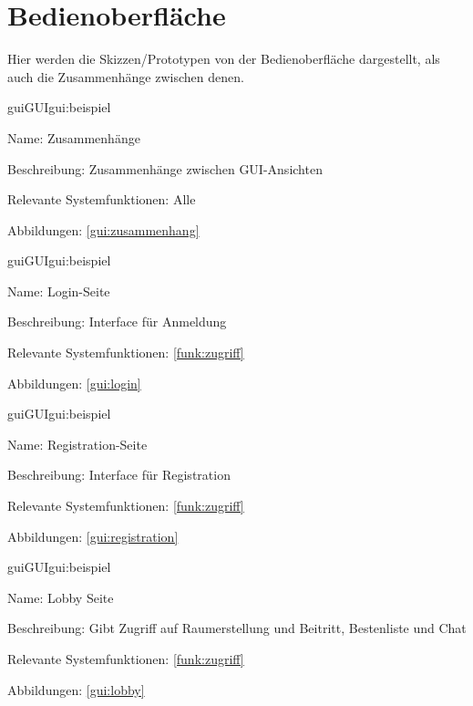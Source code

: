 
\section{Bedienoberfläche}

Hier werden die Skizzen/Prototypen von der Bedienoberfläche dargestellt, als auch die Zusammenhänge zwischen denen.

\setcounter{gui}{10}

\begin{description}[leftmargin=5em, style=sameline]	
	\begin{lhp}{gui}{GUI}{gui:beispiel}
		\item[Name:] Zusammenhänge
		\item[Beschreibung:] Zusammenhänge zwischen GUI-Ansichten
		\item[Relevante Systemfunktionen:] Alle
		\item[Abbildungen:] \ref{gui:zusammenhang}
	\end{lhp}
\end{description}

\begin{description}[leftmargin=5em, style=sameline]	
	\begin{lhp}{gui}{GUI}{gui:beispiel}
		\item[Name:] Login-Seite
		\item[Beschreibung:] Interface für Anmeldung
		\item[Relevante Systemfunktionen:] \ref{funk:zugriff}
		\item[Abbildungen:] \ref{gui:login}
	\end{lhp}
\end{description}

\begin{description}[leftmargin=5em, style=sameline]	
	\begin{lhp}{gui}{GUI}{gui:beispiel}
		\item[Name:] Registration-Seite
		\item[Beschreibung:] Interface für Registration
		\item[Relevante Systemfunktionen:] \ref{funk:zugriff}
		\item[Abbildungen:] \ref{gui:registration}
	\end{lhp}
\end{description}

\begin{description}[leftmargin=5em, style=sameline]	
	\begin{lhp}{gui}{GUI}{gui:beispiel}
		\item[Name:] Lobby Seite
		\item[Beschreibung:] Gibt Zugriff auf Raumerstellung und Beitritt, Bestenliste und Chat 
		\item[Relevante Systemfunktionen:] \ref{funk:zugriff}
		\item[Abbildungen:] \ref{gui:lobby}
	\end{lhp}
\end{description}


